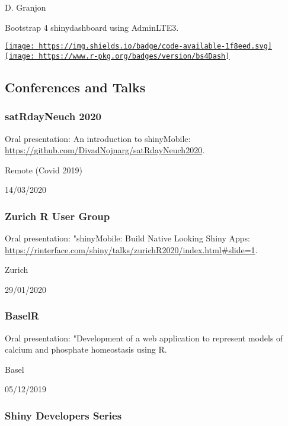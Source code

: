 \documentclass[
]{article}
\begin{document}
D. Granjon

Bootstrap 4 shinydashboard using AdminLTE3.

\href{https://github.com/RinteRface/bs4Dash}{\texttt{[image: https://img.shields.io/badge/code-available-1f8eed.svg]}}
\href{https://cran.r-project.org/package=bs4Dash}{\texttt{[image: https://www.r-pkg.org/badges/version/bs4Dash]}}

\hypertarget{conferences-and-talks}{%
\subsection{Conferences and Talks}\label{conferences-and-talks}}

\hypertarget{satrdayneuch-2020}{%
\subsubsection{satRdayNeuch 2020}\label{satrdayneuch-2020}}

Oral presentation: An introduction to shinyMobile:
\url{https://github.com/DivadNojnarg/satRdayNeuch2020}.

Remote (Covid 2019)

14/03/2020

\hypertarget{zurich-r-user-group}{%
\subsubsection{Zurich R User Group}\label{zurich-r-user-group}}

Oral presentation: "shinyMobile: Build Native Looking Shiny Apps:
\url{https://rinterface.com/shiny/talks/zurichR2020/index.html\#slide=1}.

Zurich

29/01/2020

\hypertarget{baselr}{%
\subsubsection{BaselR}\label{baselr}}

Oral presentation: "Development of a web application to represent models
of calcium and phosphate homeostasis using R.

Basel

05/12/2019

\hypertarget{shiny-developers-series}{%
\subsubsection{Shiny Developers Series}\label{shiny-developers-series}}
\end{document}
